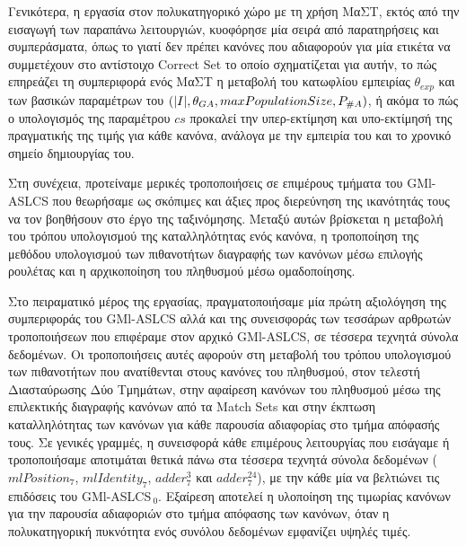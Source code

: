 Γενικότερα, η εργασία στον πολυκατηγορικό χώρο με τη χρήση ΜαΣΤ, εκτός από την εισαγωγή των παραπάνω λειτουργιών, κυοφόρησε μία σειρά από παρατηρήσεις και συμπεράσματα, όπως το γιατί δεν πρέπει κανόνες που αδιαφορούν για μία ετικέτα να συμμετέχουν στο αντίστοιχο Correct Set το οποίο σχηματίζεται για αυτήν, το πώς επηρεάζει τη συμπεριφορά ενός ΜαΣΤ η μεταβολή του κατωφλίου εμπειρίας $\theta_{exp}$ και των βασικών παραμέτρων του $(\lvert I\rvert, \theta_{GA}, maxPopulationSize, P_{\#A})$, ή ακόμα το πώς ο υπολογισμός της παραμέτρου $cs$ προκαλεί την υπερ-εκτίμηση και υπο-εκτίμησή της πραγματικής της τιμής για κάθε κανόνα, ανάλογα με την εμπειρία του και το χρονικό σημείο δημιουργίας του.

Στη συνέχεια, προτείναμε μερικές τροποποιήσεις σε επιμέρους τμήματα του GMl-ASLCS που θεωρήσαμε ως σκόπιμες και άξιες προς διερεύνηση της ικανότητάς τους να τον βοηθήσουν στο έργο της ταξινόμησης. Μεταξύ αυτών βρίσκεται η μεταβολή του τρόπου υπολογισμού της καταλληλότητας ενός κανόνα, η τροποποίηση της μεθόδου υπολογισμού των πιθανοτήτων διαγραφής των κανόνων μέσω επιλογής ρουλέτας και η αρχικοποίηση του πληθυσμού μέσω ομαδοποίησης.

Στο πειραματικό μέρος της εργασίας, πραγματοποιήσαμε μία πρώτη αξιολόγηση της συμπεριφοράς του GMl-ASLCS αλλά και της συνεισφοράς των τεσσάρων αρθρωτών τροποποιήσεων που επιφέραμε στον αρχικό GMl-ASLCS, σε τέσσερα τεχνητά σύνολα δεδομένων. Οι τροποποιήσεις αυτές αφορούν στη μεταβολή του τρόπου υπολογισμού των πιθανοτήτων που ανατίθενται στους κανόνες του πληθυσμού, στον τελεστή Διασταύρωσης Δύο Τμημάτων, στην αφαίρεση κανόνων του πληθυσμού μέσω της επιλεκτικής διαγραφής κανόνων από τα Match Sets και στην έκπτωση καταλληλότητας των κανόνων για κάθε παρουσία αδιαφορίας στο τμήμα απόφασής τους. Σε γενικές γραμμές, η συνεισφορά κάθε επιμέρους λειτουργίας που εισάγαμε ή τροποποιήσαμε αποτιμάται θετικά πάνω στα τέσσερα τεχνητά σύνολα δεδομένων ($mlPosition_{7}$, $mlIdentity_{7}$, $adder_{7}^{3}$ και $adder_{7}^{24}$), με την κάθε μία να βελτιώνει τις επιδόσεις του GMl-ASLCS$_{\:0}$. Εξαίρεση αποτελεί η υλοποίηση της τιμωρίας κανόνων για την παρουσία αδιαφοριών στο τμήμα απόφασης των κανόνων, όταν η πολυκατηγορική πυκνότητα ενός συνόλου δεδομένων εμφανίζει υψηλές τιμές. 


